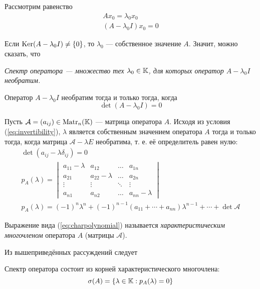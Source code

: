 Рассмотрим равенство
\vspace{-1em}
\[
    \begin{gathered}
        Ax_0 = \lambda_0 x_0 \\
        (A - \lambda_0 I)x_0 = 0 
    \end{gathered}
\]

Если $ \operatorname{Ker} (A - \lambda_0 I) \neq \left\{0\right\} $, то $\lambda_0$ — собственное значение
$A$. Значит, можно сказать, что

\emph{Спектр оператора — множество тех $\lambda_0 \in \mathbb{K}$, для которых оператор
$A - \lambda_0 I$ необратим.}

Оператор $A - \lambda_0 I$ необратим тогда и только тогда, когда 
\begin{equation} \label{eq:invertibility}
    \det (A-\lambda_0 I) = 0 
\end{equation}

Пусть $\mathcal{A} = (a_{ij}) \in \mathrm{Matr}_{n}({\mathbb{K}})$ — матрица оператора $A$. Исходя из
условия (\ref{eq:invertibility}), $\lambda$ является собственным значением
оператора $A$ тогда и только тогда, когда матрица $\mathcal{A} - \lambda E$
необратима, т. е. её определитель равен нулю:
\begin{gather} 
    \det (a_{ij} - \lambda \delta_{ij}) = 0 \nonumber \\[0.5em]
    p_A(\lambda) = \begin{vmatrix}
            a_{11} - \lambda & a_{12} & \ldots & a_{1n} \\
            a_{21} & a_{22} - \lambda & \ldots & a_{2n} \\
            \vdots & \vdots & \ddots & \vdots \\
            a_{n1} & a_{n2} & \ldots & a_{nn} - \lambda
    \end{vmatrix} \label{eq:charpolynomial} \\
    p_A(\lambda) = (-1)^{n}\lambda^n + (-1)^{n-1} (a_{11} + \dotsb +
    a_{nn}) \lambda^{n-1} + \dotsb + \det \mathcal{A} \label{eq:charpolynomialexp}
\end{gather}

\begin{definition}
    Выражение вида (\ref{eq:charpolynomial}) называется \emph{характеристическим
    многочленом} оператора $A$ (матрицы $\mathcal{A}$).
\end{definition}

Из вышеприведённых рассуждений следует
\begin{theorem} \label{th:charpolynomial}
    Спектр оператора состоит из корней характеристического многочлена:
    \[ \operatorname{\sigma}(A) = \left\{\lambda \in \mathbb{K} : p_A(\lambda) = 0 \right\} \]
\end{theorem}


